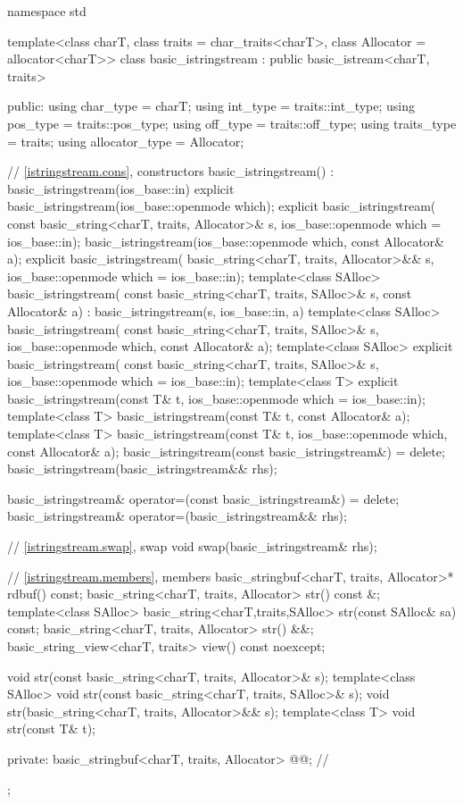 %
\begin{codeblock}
namespace std {
  template<class charT, class traits = char_traits<charT>, class Allocator = allocator<charT>>
  class basic_istringstream : public basic_istream<charT, traits> {
  public:
    using char_type      = charT;
    using int_type       = traits::int_type;
    using pos_type       = traits::pos_type;
    using off_type       = traits::off_type;
    using traits_type    = traits;
    using allocator_type = Allocator;

    // \ref{istringstream.cons}, constructors
    basic_istringstream() : basic_istringstream(ios_base::in) {}
    explicit basic_istringstream(ios_base::openmode which);
    explicit basic_istringstream(
      const basic_string<charT, traits, Allocator>& s,
      ios_base::openmode which = ios_base::in);
    basic_istringstream(ios_base::openmode which, const Allocator& a);
    explicit basic_istringstream(
      basic_string<charT, traits, Allocator>&& s,
      ios_base::openmode which = ios_base::in);
    template<class SAlloc>
      basic_istringstream(
        const basic_string<charT, traits, SAlloc>& s, const Allocator& a)
        : basic_istringstream(s, ios_base::in, a) {}
    template<class SAlloc>
      basic_istringstream(
        const basic_string<charT, traits, SAlloc>& s,
        ios_base::openmode which, const Allocator& a);
    template<class SAlloc>
      explicit basic_istringstream(
        const basic_string<charT, traits, SAlloc>& s,
        ios_base::openmode which = ios_base::in);
    template<class T>
      explicit basic_istringstream(const T& t, ios_base::openmode which = ios_base::in);
    template<class T>
      basic_istringstream(const T& t, const Allocator& a);
    template<class T>
      basic_istringstream(const T& t, ios_base::openmode which, const Allocator& a);
    basic_istringstream(const basic_istringstream&) = delete;
    basic_istringstream(basic_istringstream&& rhs);

    basic_istringstream& operator=(const basic_istringstream&) = delete;
    basic_istringstream& operator=(basic_istringstream&& rhs);

    // \ref{istringstream.swap}, swap
    void swap(basic_istringstream& rhs);

    // \ref{istringstream.members}, members
    basic_stringbuf<charT, traits, Allocator>* rdbuf() const;
    basic_string<charT, traits, Allocator> str() const &;
    template<class SAlloc>
      basic_string<charT,traits,SAlloc> str(const SAlloc& sa) const;
    basic_string<charT, traits, Allocator> str() &&;
    basic_string_view<charT, traits> view() const noexcept;

    void str(const basic_string<charT, traits, Allocator>& s);
    template<class SAlloc>
      void str(const basic_string<charT, traits, SAlloc>& s);
    void str(basic_string<charT, traits, Allocator>&& s);
    template<class T>
      void str(const T& t);

  private:
    basic_stringbuf<charT, traits, Allocator> @@;   // \expos
  };
}
\end{codeblock}

